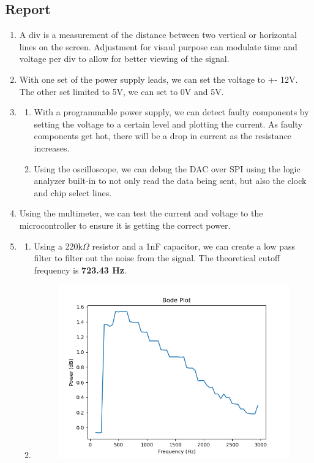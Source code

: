 \documentclass{article}
\begin{document}
    \subsection*{Report}
    \begin{enumerate}
       \item A div is a measurement of the distance between two vertical or horizontal lines on the screen. Adjustment for visaul purpose can modulate time and voltage per div to allow for better viewing of the signal. 
       \item With one set of the power supply leads, we can set the voltage to +- 12V. The other set limited to 5V, we can set to 0V and 5V.
       \item 
       \begin{enumerate}
        \item With a programmable power supply, we can detect faulty components by setting the voltage to a certain level and plotting the current. As faulty components get hot, there will be a drop in current as the resistance increases.
        \item Using the oscilloscope, we can debug the DAC over SPI using the logic analyzer built-in to not only read the data being sent, but also the clock and chip select lines.
       \end{enumerate}
       \item Using the multimeter, we can test the current and voltage to the microcontroller to ensure it is getting the correct power.
       \item
       \begin{enumerate}
        \item Using a 220k$\Omega$ resistor and a 1nF capacitor, we can create a low pass filter to filter out the noise from the signal. The theoretical cutoff frequency is \textbf{723.43 Hz}.     
        \item 
        \begin{figure}[H]
            \centering
            \includegraphics[width=1\textwidth]{bode.png}

\end{figure}
\end{enumerate}
\end{enumerate}
\end{document}
